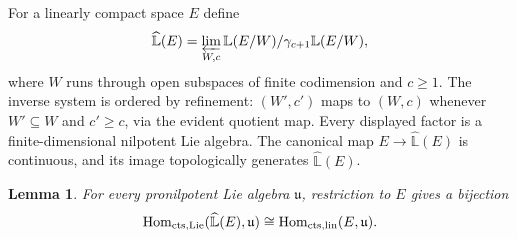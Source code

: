 \documentclass[11pt,a4paper]{article}
\newtheorem{lemma}[theorem]{Lemma}
\theoremstyle{definition}
\newcommand{\Hom}{\operatorname{Hom}}
\newcommand{\LL}{\widehat{\mathbb L}}
\begin{document}
For a linearly compact space $E$ define
\begin{equation}\label{eq:free-lie}
 \LL(E)=\varprojlim_{W,c}
 \mathbb L(E/W)/\gamma_{c+1}\mathbb L(E/W),
\end{equation}
where $W$ runs through open subspaces of finite codimension and $c\geq1$.
The inverse system is ordered by refinement: $(W',c')$ maps to $(W,c)$
whenever $W'\subseteq W$ and $c'\geq c$, via the evident quotient map.
Every displayed factor is a finite-dimensional nilpotent Lie algebra.
The canonical map $E\to\LL(E)$ is continuous, and its image
topologically generates $\LL(E)$.

\begin{lemma}\label{lem:universal}
For every pronilpotent Lie algebra $\mathfrak u$, restriction to $E$ gives
a bijection
\[
 \Hom_{\rm cts,Lie}(\LL(E),\mathfrak u)
 \cong \Hom_{\rm cts,lin}(E,\mathfrak u).
\]
\end{lemma}
\end{document}
